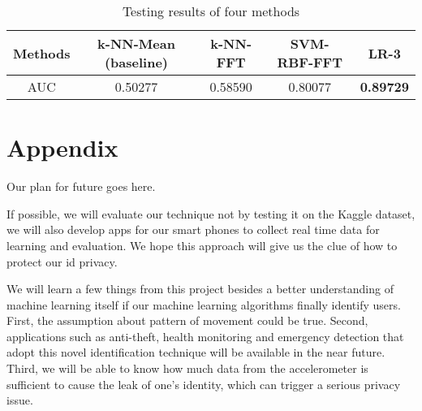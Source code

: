 \documentclass{article} %
\begin{document}
\begin{table}[!ht]
\caption{Testing results of four methods}
\label{tbl:test_result}
	\begin{center}
		\begin{tabular}{ c | c  c  c  c }
			\hline
			 Methods & k-NN-Mean (baseline) & k-NN-FFT & SVM-RBF-FFT & LR-3 \\
			 \hline
			 AUC & 0.50277 & 0.58590 & 0.80077 & \textbf{0.89729} \\
			 \hline
		\end{tabular}
	\end{center}
\end{table}

\section*{Appendix}

Our plan for future goes here.

If possible, we will evaluate our technique not by testing it on the Kaggle dataset, we will also develop apps for our smart phones to collect real time data for learning and evaluation. We hope this approach will give us the clue of how to protect our id privacy.

We will learn a few things from this project besides a better understanding of machine learning itself if our machine learning algorithms finally identify users. First, the assumption about pattern of movement could be true. Second, applications such as anti-theft, health monitoring and emergency detection that adopt this novel identification technique will be available in the near future. Third, we will be able to know how much data from the accelerometer is sufficient to cause the leak of one's identity, which can trigger a serious privacy issue.






\end{document}
